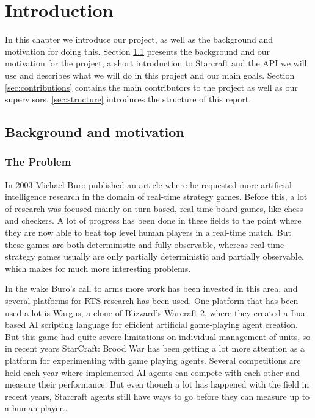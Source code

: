 
\chapter{Introduction}
In this chapter we introduce our project, as well as the background and motivation for doing this. Section \ref{sec:background} presents the background and our motivation for the project, a short introduction to Starcraft and the API we will use and describes what we will do in this project and our main goals. Section \ref{sec:contributions} contains the main contributors to the project as well as our supervisors. \ref{sec:structure} introduces the structure of this report.
\section{Background and motivation}
\label{sec:background}
\subsection{The Problem}
In 2003 Michael Buro published an article where he requested more artificial
intelligence research in the domain of real-time strategy
games.\cite{buro2003real} Before this, a lot of research was focused mainly on
turn based, real-time board games, like chess and checkers. A lot of
progress has been done in these fields to the point where they are now able to
beat top level human players in a real-time match. \cite{campbell2002deep} But
these games are both deterministic and fully observable, whereas real-time
strategy games usually are only partially deterministic and partially
observable, which makes for much more interesting problems.

In the wake Buro's call to arms more work has been invested in this area, and
several platforms for RTS research has been used. One platform that has been
used a lot is Wargus\cite{wargus}, a clone of Blizzard's Warcraft 2, where they
created a Lua-based AI scripting language for efficient artificial game-playing
agent creation. But this game had quite severe limitations on individual
management of units, so in recent years StarCraft: Brood War has been getting a
lot more attention as a platform for experimenting with game playing agents.
Several competitions are held each year where implemented AI agents can
compete with each other and measure their performance. But even though a lot has
happened with the field in recent years, Starcraft agents still have ways to go
before they can measure up to a human player.\cite{eisbotvsfong}.

